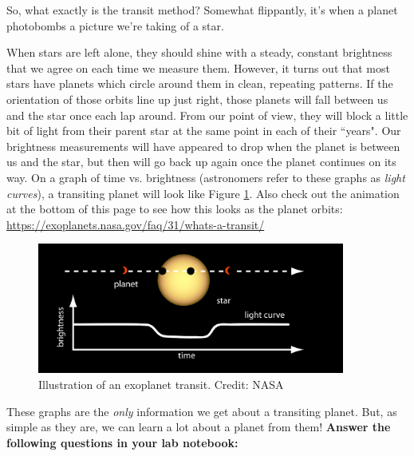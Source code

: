 \documentclass[11pt]{article}
\begin{document}
\medskip \noindent
So, what exactly is the transit method? Somewhat flippantly, it’s when a planet photobombs a picture we’re taking of a star.

\medskip \noindent
When stars are left alone, they should shine with a steady, constant brightness that we agree on each time we measure them. However, it turns out that most stars have planets which circle around them in clean, repeating patterns. If the orientation of those orbits line up just right, those planets will fall between us and the star once each lap around. From our point of view, they will block a little bit of light from their parent star at the same point in each of their ``years". Our brightness measurements will have appeared to drop when the planet is between us and the star, but then will go back up again once the planet continues on its way. On a graph of time vs. brightness (astronomers refer to these graphs as \textit{light curves}), a transiting planet will look like Figure \ref{fig:transit}. Also check out the animation at the bottom of this page to see how this looks as the planet orbits: \url{https://exoplanets.nasa.gov/faq/31/whats-a-transit/}

\begin{figure}[h!]
    \centering
    \includegraphics[width=0.9\textwidth]{Images/transit_cartoon.png}
    \caption{Illustration of an exoplanet transit. Credit: NASA}
    \label{fig:transit}
\end{figure}

\medskip \noindent
These graphs are the \textit{only} information we get about a transiting planet. But, as simple as they are, we can learn a lot about a planet from them!  \textbf{Answer the following questions in your lab notebook:}
\end{document}
